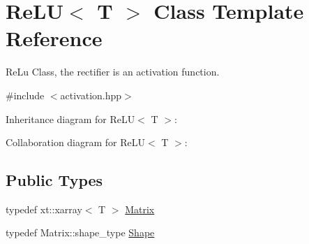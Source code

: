 \hypertarget{class_re_l_u}{}\section{Re\+LU$<$ T $>$ Class Template Reference}
\label{class_re_l_u}


Re\+Lu Class, the rectifier is an activation function.  




{\ttfamily \#include $<$activation.\+hpp$>$}



Inheritance diagram for Re\+LU$<$ T $>$\+:


Collaboration diagram for Re\+LU$<$ T $>$\+:
\subsection*{Public Types}
\begin{DoxyCompactItemize}
\item 
typedef xt\+::xarray$<$ T $>$ \mbox{\hyperlink{class_re_l_u_a3d1448f06335a4ab7227ec31a43a410f}{Matrix}}
\item 
typedef Matrix\+::shape\+\_\+type \mbox{\hyperlink{class_re_l_u_ae27e6aba0a09baa85b8ef8679db42719}{Shape}}
\end{DoxyCompactItemize}
